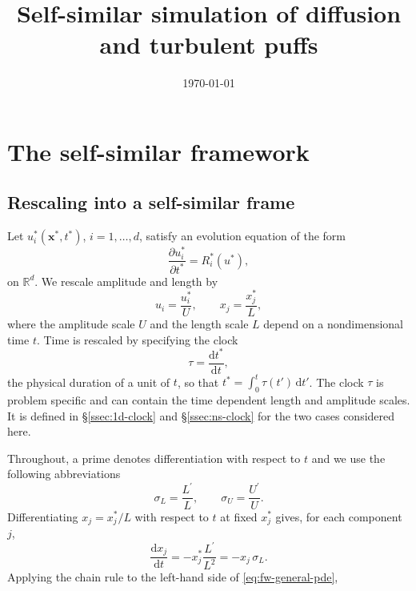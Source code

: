 \documentclass{article}
\title{Self-similar simulation of diffusion and turbulent puffs}
\author{}
\date{\today}
\begin{document}
\maketitle

\section{The self-similar framework}\label{sec:framework}


\subsection{Rescaling into a self-similar frame}\label{ssec:fw-rescaling}

Let $u_i^*(\mathbf{x}^*, t^*)$, $i = 1, \dots, d$, satisfy an evolution
equation of the form
\begin{equation}\label{eq:fw-general-pde}
  \frac{\partial u_i^*}{\partial t^*} = R_i^*(u^*),
\end{equation}
on $\mathbb{R}^d$. We rescale amplitude and length by
\begin{equation}\label{eq:fw-nondim}
  u_i = \frac{u_i^*}{U}, \qquad
  x_j = \frac{x_j^*}{L},
\end{equation}
where the amplitude scale $U$ and the length scale $L$ depend on a nondimensional time $t$. Time
is rescaled by specifying the clock
\begin{equation}\label{eq:fw-clock}
  \tau = \frac{\mathrm{d}t^*}{\mathrm{d}t},
\end{equation}
the physical duration of a unit of $t$, so that $t^* = \int_0^t \tau(t')\, \mathrm{d}t'$.
The clock $\tau$ is problem specific and can contain the time dependent length and amplitude scales.
It is defined in \S\ref{ssec:1d-clock} and \S\ref{ssec:ns-clock} for the two cases considered here.
\par
Throughout, a prime denotes differentiation with respect to $t$ and we use the following abbreviations
\begin{equation}\label{eq:fw-rates}
  \sigma_L = \frac{L^\prime}{L}, \qquad \sigma_U = \frac{U^\prime}{U}.
\end{equation}
Differentiating $x_j = x_j^*/L$ with respect to $t$ at fixed $x_j^*$ gives,
for each component $j$,
\begin{equation}\label{eq:fw-dxdt}
  \frac{\mathrm{d} x_j}{\mathrm{d} t} = -x_j^* \frac{L^\prime}{L^2} = -x_j\, \sigma_L .
\end{equation}
Applying the chain rule to the left-hand side of \eqref{eq:fw-general-pde},
\end{document}
